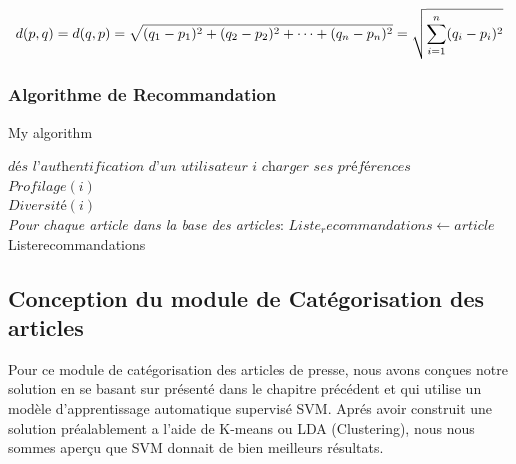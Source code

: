             \[d({p} ,{q})=d({q} ,{p})={\sqrt {(q_{1}-p_{1})^{2}+(q_{2}-p_{2})^{2}+\cdots +(q_{n}-p_{n})^{2}}}\\
            ={\sqrt {\sum _{i=1}^{n}(q_{i}-p_{i})^{2}}}\]
  
	
	

\subsubsection{Algorithme de Recommandation}

\begin{algorithm}
	\caption{My algorithm}\label{euclid}
	\begin{algorithmic}[1]
		\State $\textit{dés l'authentification d'un utilisateur i charger ses préférences}$\\
		\State $\textit{Profilage}(i)$\\
		\State $\textit{Diversité}(i)$\\
		\emph{Pour chaque article dans la base des articles}:
		\State $Liste_recommandations \gets article$\\
		\Return Listerecommandations
		\EndProcedure
     \end{algorithmic}
\end{algorithm}


\subsection{Conception du module de Catégorisation des articles}
Pour ce module de catégorisation des articles de presse, nous avons conçues notre solution en se basant sur \cite{miusfbvimuab} présenté dans le chapitre précédent et qui utilise un modèle d'apprentissage automatique supervisé SVM. Aprés avoir construit une solution préalablement a l'aide de K-means ou LDA (Clustering), nous nous sommes aperçu que SVM donnait de bien meilleurs résultats.\\


